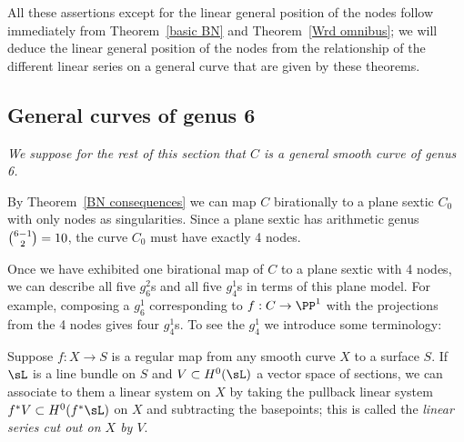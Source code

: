 All these assertions except for the linear general position of the nodes
follow immediately from
Theorem~\ref{basic BN} and
Theorem~\ref{Wrd omnibus}; we will deduce the linear general position
of the nodes from the relationship of the different
linear series on a general curve that are given by these theorems.

\subsection{General curves of genus 6}
\emph{We suppose for the rest of this section that $C$ is a general
smooth curve of genus 6.}

By Theorem~\ref{BN consequences} we can map $C$ birationally to a plane
sextic $C_0$ with only nodes as singularities. Since a plane sextic has
arithmetic genus $\tbinom{6-1}{2} = 10$, the curve $C_{0}$
must have exactly 4 nodes.

Once we have exhibited one birational map of $C$ to a plane sextic with
4 nodes, we can describe all five $g^2_6$s and all five $g^1_4$s in terms
of this plane model. For example, composing a $g^1_6$ corresponding to $f:
C\to \PP^1$ with the projections from the 4 nodes gives four $g^1_4$s. To
see the 
$g^{1}_{4}$ we introduce some terminology:

Suppose $f : X \to S$ is a regular map from any smooth curve $X$ to a
surface $S$. If $\sL $ is a line bundle on $S$ and $V \subset H^0(\sL
)$ a vector space of sections, we can associate to them a linear system
on $X$ by taking the pullback linear system $f^*V \subset H^0(f^*\sL )$
on $X$ and subtracting the basepoints; this is called the 
\emph{linear series cut out on $X$ by $V$}.
%

